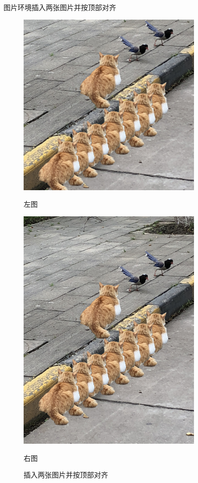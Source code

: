 \documentclass[no-math, compress]{beamer}
\begin{document}
\begin{frame}{图片环境}{插入两张图片并按顶部对齐}
    \vspace{-1em}
    \begin{figure}
        \centering
        \begin{minipage}[t]{0.4\textwidth}
            \centering\vspace{0pt}
            \includegraphics[width=0.8\textwidth]{thumbnail-image01}
            \caption{左图}
        \end{minipage}
        \qquad
        \begin{minipage}[t]{0.4\textwidth}
            \centering\vspace{0pt}
            \includegraphics[width=0.8\textwidth]{image01}
            \caption{右图}
        \end{minipage}
        \caption{插入两张图片并按顶部对齐}
    \end{figure}
\end{frame}
\end{document}
